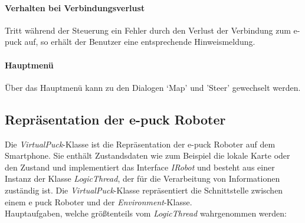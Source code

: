 \documentclass[10pt,a4paper]{article}
\begin{document}
	\paragraph*{Verhalten bei Verbindungsverlust} Tritt während der Steuerung ein Fehler durch den Verlust der Verbindung zum e-puck auf, so erhält
	 der Benutzer eine entsprechende Hinweismeldung.
	
	\paragraph*{Hauptmenü} Über das Hauptmenü kann zu den Dialogen `Map' und 'Steer' gewechselt werden.        
      		
      \subsection{Repräsentation der e-puck Roboter}
      	\label{sec:repraesentation}
		Die \textit{VirtualPuck}-Klasse ist die Repräsentation der e-puck Roboter auf dem Smartphone. Sie enthält Zustandsdaten wie zum Beispiel die
		lokale Karte oder den Zustand und implementiert das Interface \textit{IRobot} und besteht aus einer Instanz der Klasse \textit{LogicThread},
		der für die Verarbeitung von Informationen zuständig ist. Die \textit{VirtualPuck}-Klasse repräsentiert die Schnittstelle zwischen einem e
		puck Roboter und der \textit{Environment}-Klasse. \\
		Hauptaufgaben, welche größtenteils vom \textit{LogicThread} wahrgenommen werden:
\end{document}
